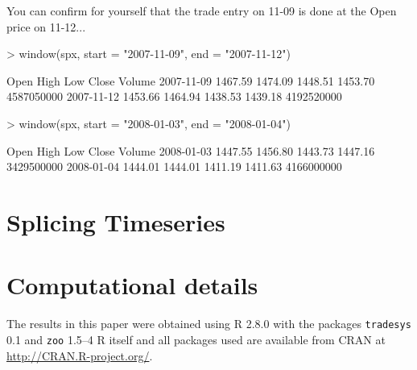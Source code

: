 \documentclass[a4]{article}
\newcommand{\code}[1]{\texttt{#1}}
\begin{document}
You can confirm for yourself that the trade entry on 11-09 is done 
at the Open price on 11-12...
\begin{Schunk}
\begin{Sinput}
> window(spx, start = "2007-11-09", end = "2007-11-12")
\end{Sinput}
\begin{Soutput}
              Open    High     Low   Close     Volume
2007-11-09 1467.59 1474.09 1448.51 1453.70 4587050000
2007-11-12 1453.66 1464.94 1438.53 1439.18 4192520000
\end{Soutput}
\begin{Sinput}
> window(spx, start = "2008-01-03", end = "2008-01-04")
\end{Sinput}
\begin{Soutput}
              Open    High     Low   Close     Volume
2008-01-03 1447.55 1456.80 1443.73 1447.16 3429500000
2008-01-04 1444.01 1444.01 1411.19 1411.63 4166000000
\end{Soutput}
\end{Schunk}

\section{Splicing Timeseries}
\section*{Computational details}
The results in this paper were obtained using R
2.8.0 with the packages
\code{tradesys} 0.1 
and \code{zoo}  1.5--4 R itself
and all packages used are available from CRAN at
\url{http://CRAN.R-project.org/}.
\end{document}
